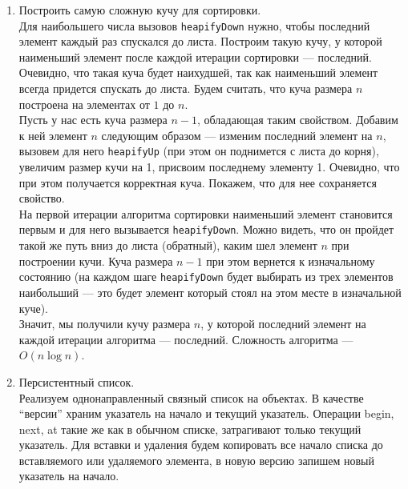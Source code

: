 \documentclass[10pt]{article}
\begin{document}
\begin{enumerate}
	\item Построить самую сложную кучу для сортировки.\\
	Для наибольшего числа вызовов \texttt{heapifyDown} нужно, чтобы последний элемент каждый раз спускался до листа. Построим такую кучу, у которой наименьший элемент после каждой итерации сортировки --- последний. Очевидно, что такая куча будет наихудшей, так как наименьший элемент всегда придется спускать до листа. Будем считать, что куча размера $n$ построена на элементах от $1$ до $n$.\\
	Пусть у нас есть куча размера $n-1$, обладающая таким свойством. Добавим к ней элемент $n$ следующим образом --- изменим последний элемент на $n$, вызовем для него \texttt{heapifyUp} (при этом он поднимется с листа до корня), увеличим размер кучи на 1, присвоим последнему элементу 1. Очевидно, что при этом получается корректная куча. Покажем, что для нее сохраняется свойство.\\
	На первой итерации алгоритма сортировки наименьший элемент становится первым и для него вызывается \texttt{heapifyDown}. Можно видеть, что он пройдет такой же путь вниз до листа (обратный), каким шел элемент $n$ при построении кучи. Куча размера $n-1$ при этом вернется к изначальному состоянию (на каждом шаге \texttt{heapifyDown} будет выбирать из трех элементов наибольший --- это будет элемент который стоял на этом месте в изначальной куче).\\
	Значит, мы получили кучу размера $n$, у которой последний элемент на каждой итерации алгоритма --- последний. Сложность алгоритма --- $O(n \log n)$.
	
	\item Персистентный список.\\
	Реализуем однонаправленный связный список на объектах. В качестве ``версии'' храним указатель на начало и текущий указатель. Операции begin, next, at такие же как в обычном списке, затрагивают только текущий указатель. Для вставки и удаления будем копировать все начало списка до вставляемого или удаляемого элемента, в новую версию запишем новый указатель на начало.
	
\end{enumerate}
\end{document}
